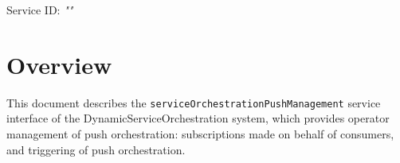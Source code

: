 \documentclass[a4paper]{arrowhead}
\begin{document}
\sloppy

\ArrowheadSetup

\begin{center}
  \vspace*{1cm}
  \huge{\arrowtitle}

  \vspace*{0.2cm}
  \LARGE{\arrowtype}
  \vspace*{1cm}

  \Large{Service ID: \textit{"\arrowid"}}

  \vspace*{\fill}


  \vspace*{1cm}
  \vspace*{\fill}

  \begin{abstract}
    This document describes the HTTP/1.1 protocol with TLS payload security and JSON payload encoding variant of the \texttt{service\allowbreak{}Orchestration\allowbreak{}Push\allowbreak{}Management} service of the DynamicServiceOrchestration system.
  \end{abstract}

  \vspace*{1cm}
\end{center}

\newpage

\tableofcontents
\newpage

\section{Overview}
\label{sec:overview}

This document describes the \texttt{service\allowbreak{}Orchestration\allowbreak{}Push\allowbreak{}Management} service interface of the DynamicServiceOrchestration system, which provides operator management of push orchestration: subscriptions made on behalf of consumers, and triggering of push orchestration.
\end{document}
